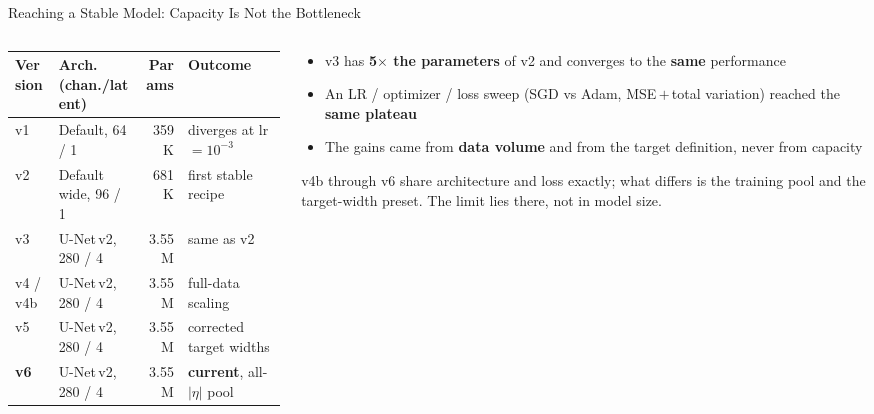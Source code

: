 \documentclass[xcolor=table,aspectratio=169]{beamer}
\begin{document}
\begin{frame}{Reaching a Stable Model: Capacity Is Not the Bottleneck}
    \begin{columns}[c]
        \begin{column}{0.62\linewidth}
            \centering
            \footnotesize
            \begin{tabular}{llrl}
                \toprule
                Version & Arch. (chan./latent) & Params & Outcome \\
                \midrule
                v1  & Default, 64 / 1     & 359K & diverges at lr$=10^{-3}$ \\
                v2  & Default wide, 96 / 1 & 681K & first stable recipe \\
                v3  & U-Net\,v2, 280 / 4  & 3.55M & same as v2 \\
                v4 / v4b  & U-Net\,v2, 280 / 4  & 3.55M & full-data scaling \\
                v5  & U-Net\,v2, 280 / 4 & 3.55M & corrected target widths \\
                \textbf{v6} & U-Net\,v2, 280 / 4 & 3.55M & \textbf{current}, all-$|\eta|$ pool \\
                \bottomrule
            \end{tabular}
        \end{column}
        \begin{column}{0.38\linewidth}
            \small
            \begin{itemize}\setlength\itemsep{0.35em}
                \item v3 has \textbf{5$\times$ the parameters} of v2 and converges to the \textbf{same} performance
                \item An LR / optimizer / loss sweep (SGD vs Adam, MSE\,$+$\,total variation) reached the \textbf{same plateau}
                \item The gains came from \textbf{data volume} and from the target definition, never from capacity
            \end{itemize}
            \vspace{0.4em}
            {\footnotesize\textcolor{black!55}{v4b through v6 share architecture and
            loss exactly; what differs is the training pool and the target-width
            preset. The limit lies there, not in model size.}}
        \end{column}
    \end{columns}
\end{frame}
\end{document}
